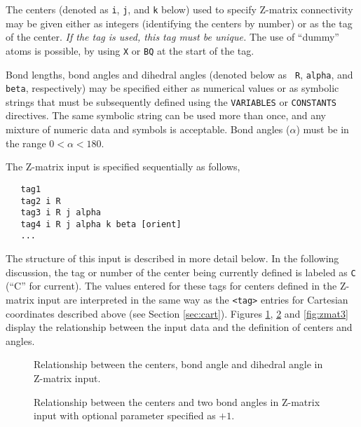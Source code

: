 
The centers (denoted as \verb+i+, \verb+j+, and \verb+k+ below) used
to specify Z-matrix connectivity may be given either as integers
(identifying the centers by number) or as the tag of the center.
{\em If the tag is used, this tag must be unique.} The use of
``dummy'' atoms is possible, by using \verb+X+ or \verb+BQ+ at the
start of the tag.

Bond lengths, bond angles and dihedral angles (denoted below as {\tt
  R}, {\tt alpha}, and {\tt beta}, respectively) may be specified either as
numerical values or as symbolic strings that must be subsequently
defined using the \verb+VARIABLES+ or 
\verb+CONSTANTS+ directives.  The same symbolic string can be used
more than once, and any
mixture of numeric data and symbols is acceptable. Bond angles
($\alpha$) must be in the range $0 < \alpha < 180$.

The Z-matrix input is specified sequentially as follows,
\begin{verbatim}
   tag1
   tag2 i R
   tag3 i R j alpha
   tag4 i R j alpha k beta [orient]
   ...
\end{verbatim}

The structure of this input is described in more detail below.  
In the following discussion, the tag or number
of the center being currently defined is labeled as \verb+C+ (``C''
for current).  The values entered for these tags for centers 
defined in the Z-matrix input are interpreted
in the same way as the \verb+<tag>+ entries for Cartesian
coordinates described above (see Section \ref{sec:cart}).
Figures \ref{fig:zmat1}, \ref{fig:zmat2} and \ref{fig:zmat3}
display the relationship between the input data and the definition of
centers and angles.

\begin{figure}[htbp]
\centering
{}

\caption{\label{fig:zmat1} Relationship between the centers, bond angle
and dihedral angle in Z-matrix input.}
\end{figure}

\begin{figure}[htbp]
\centering
{}

\caption{\label{fig:zmat2} Relationship between the centers and two
  bond angles in Z-matrix input with optional parameter specified as $+1$.}
\end{figure}


